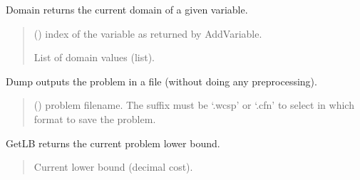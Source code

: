 \documentclass[letterpaper,10pt,openany,oneside,english]{sphinxmanual}
\begin{document}
\begin{fulllineitems}
\begin{fulllineitems}
\end{fulllineitems}


\begin{fulllineitems}
\label{\detokenize{ref/ref_python:pytoulbar2.CFN.Domain}}
\pysigstartsignatures
{}
\pysigstopsignatures
\sphinxAtStartPar
Domain returns the current domain of a given variable.
\begin{quote}\begin{description}
\sphinxAtStartPar
{} () \textendash{} index of the variable as returned by AddVariable.

\sphinxAtStartPar
List of domain values (list).

\end{description}\end{quote}

\end{fulllineitems}


\begin{fulllineitems}
\label{\detokenize{ref/ref_python:pytoulbar2.CFN.Dump}}
\pysigstartsignatures
{}
\pysigstopsignatures
\sphinxAtStartPar
Dump outputs the problem in a file (without doing any preprocessing).
\begin{quote}\begin{description}
\sphinxAtStartPar
{} () \textendash{} problem filename. The suffix must be ‘.wcsp’ or ‘.cfn’ to select in which format to save the problem.

\end{description}\end{quote}

\end{fulllineitems}


\begin{fulllineitems}
\label{\detokenize{ref/ref_python:pytoulbar2.CFN.GetLB}}
\pysigstartsignatures
{}
\pysigstopsignatures
\sphinxAtStartPar
GetLB returns the current problem lower bound.
\begin{quote}\begin{description}
\sphinxAtStartPar
Current lower bound (decimal cost).


\end{description}
\end{quote}
\end{fulllineitems}
\end{fulllineitems}
\end{document}

